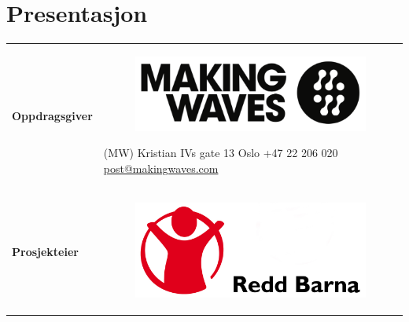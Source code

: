 \chapter{Presentasjon}
\vspace{-1.5cm}
\begin{flushleft}
\renewcommand{\arraystretch}{1.5}
\begin{tabular}[ht]{@{}lp{100mm}@{}}
\textbf{Oppdragsgiver} & 
\begin{figure}
\vspace{-0.75cm}
\hspace{-2.5cm}
\includegraphics[scale=0.15, keepaspectratio]{./img/presentasjon/mw_logo.png}
\end{figure}
\vspace{-0.25cm}
\href{http://www.makingwaves.no/}{\mw{}} (MW) \newline Kristian IVs gate 13 \newline 0164 Oslo \newline +47 22 206 020 \newline \href{mailto:post@makingwaves.com}{post@makingwaves.com} \\
\textbf{Prosjekteier} & 
\begin{figure}
\vspace{-0.75cm}
\hspace{-2.5cm}
\includegraphics[scale=0.075, keepaspectratio]{./img/presentasjon/rb_logo.jpg}
\end{figure}
\vspace{-0.3cm}

\end{tabular}
\end{flushleft}
